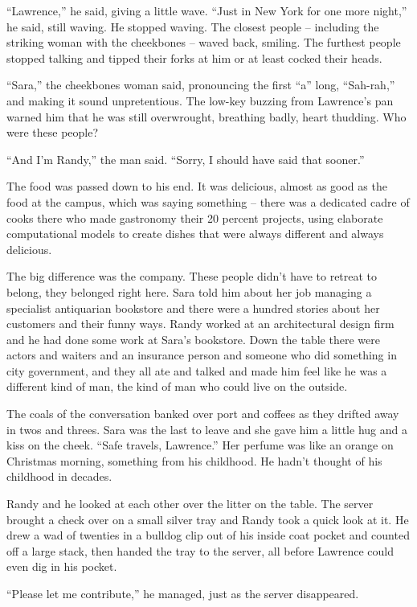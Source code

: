 “Lawrence,” he said, giving a little wave. “Just in New York for 
one more night,” he said, still waving. He stopped waving. The 
closest people -- including the striking woman with the cheekbones -- 
waved back, smiling. The furthest people stopped talking and tipped 
their forks at him or at least cocked their heads.

“Sara,” the cheekbones woman said, pronouncing the first “a” 
long, “Sah-rah,” and making it sound unpretentious. The low-key 
buzzing from Lawrence's pan warned him that he was still overwrought, 
breathing badly, heart thudding. Who were these people?

“And I'm Randy,” the man said. “Sorry, I should have said that 
sooner.”

The food was passed down to his end. It was delicious, almost as good 
as the food at the campus, which was saying something -- there was a 
dedicated cadre of cooks there who made gastronomy their 20 percent 
projects, using elaborate computational models to create dishes that 
were always different and always delicious.

The big difference was the company. These people didn't have to retreat 
to belong, they belonged right here. Sara told him about her job 
managing a specialist antiquarian bookstore and there were a hundred 
stories about her customers and their funny ways. Randy worked at an 
architectural design firm and he had done some work at Sara's 
bookstore. Down the table there were actors and waiters and an 
insurance person and someone who did something in city government, and 
they all ate and talked and made him feel like he was a different kind 
of man, the kind of man who could live on the outside.

The coals of the conversation banked over port and coffees as they 
drifted away in twos and threes. Sara was the last to leave and she 
gave him a little hug and a kiss on the cheek. “Safe travels, 
Lawrence.” Her perfume was like an orange on Christmas morning, 
something from his childhood. He hadn't thought of his childhood in 
decades.

Randy and he looked at each other over the litter on the table. The 
server brought a check over on a small silver tray and Randy took a 
quick look at it. He drew a wad of twenties in a bulldog clip out of 
his inside coat pocket and counted off a large stack, then handed the 
tray to the server, all before Lawrence could even dig in his pocket.

“Please let me contribute,” he managed, just as the server 
disappeared.


